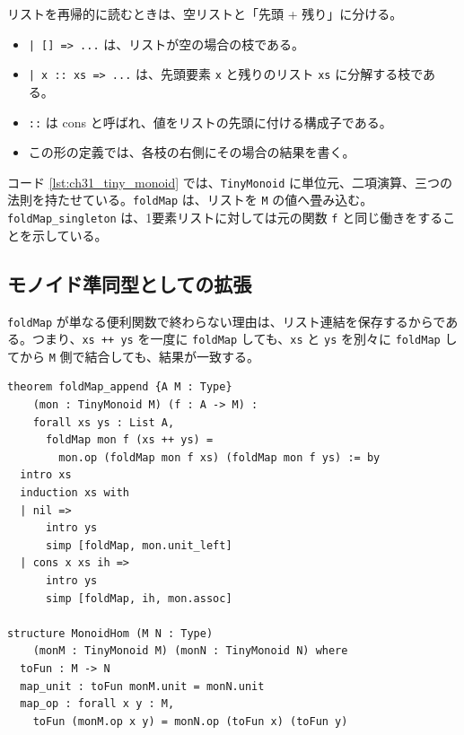 \begin{syntaxbox}
リストを再帰的に読むときは、空リストと「先頭 + 残り」に分ける。
\begin{itemize}
\item \texttt{| [] => ...} は、リストが空の場合の枝である。
\item \texttt{| x :: xs => ...} は、先頭要素 \texttt{x} と残りのリスト \texttt{xs} に分解する枝である。
\item \texttt{::} は cons と呼ばれ、値をリストの先頭に付ける構成子である。
\item この形の定義では、各枝の右側にその場合の結果を書く。
\end{itemize}
\end{syntaxbox}

コード \ref{lst:ch31_tiny_monoid} では、\texttt{TinyMonoid} に単位元、二項演算、三つの法則を持たせている。\texttt{foldMap} は、リストを \texttt{M} の値へ畳み込む。\texttt{foldMap\_singleton} は、1要素リストに対しては元の関数 \texttt{f} と同じ働きをすることを示している。

\subsection{モノイド準同型としての拡張}

\texttt{foldMap} が単なる便利関数で終わらない理由は、リスト連結を保存するからである。つまり、\texttt{xs ++ ys} を一度に \texttt{foldMap} しても、\texttt{xs} と \texttt{ys} を別々に \texttt{foldMap} してから \texttt{M} 側で結合しても、結果が一致する。

\begin{listing}[htbp]
\begin{verbatim}
theorem foldMap_append {A M : Type}
    (mon : TinyMonoid M) (f : A -> M) :
    forall xs ys : List A,
      foldMap mon f (xs ++ ys) =
        mon.op (foldMap mon f xs) (foldMap mon f ys) := by
  intro xs
  induction xs with
  | nil =>
      intro ys
      simp [foldMap, mon.unit_left]
  | cons x xs ih =>
      intro ys
      simp [foldMap, ih, mon.assoc]

structure MonoidHom (M N : Type)
    (monM : TinyMonoid M) (monN : TinyMonoid N) where
  toFun : M -> N
  map_unit : toFun monM.unit = monN.unit
  map_op : forall x y : M,
    toFun (monM.op x y) = monN.op (toFun x) (toFun y)
\end{verbatim}
\caption{foldMap はリスト連結をモノイド演算へ送る}
\label{lst:ch31_foldmap_hom}
\end{listing}


